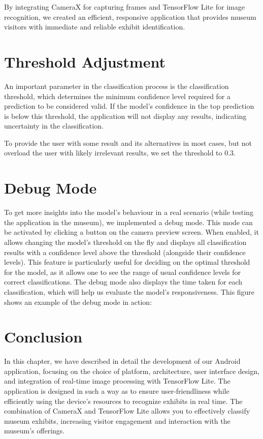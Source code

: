 By integrating CameraX for capturing frames and TensorFlow Lite for image recognition, we created an efficient, responsive application that provides museum visitors with immediate and reliable exhibit identification.

\section{Threshold Adjustment}

An important parameter in the classification process is the classification threshold, which determines the minimum confidence level required for a prediction to be considered valid. If the model's confidence in the top prediction is below this threshold, the application will not display any results, indicating uncertainty in the classification. 

To provide the user with some result and its alternatives in most cases, but not overload the user with likely irrelevant results, we set the threshold to 0.3.

\section{Debug Mode}

To get more insights into the model's behaviour in a real scenario (while testing the application in the museum), we implemented a debug mode. This mode can be activated by clicking a button on the camera preview screen. When enabled, it allows changing the model's threshold on the fly and displays all classification results with a confidence level above the threshold (alongside their confidence levels). This feature is particularly useful for deciding on the optimal threshold for the model, as it allows one to see the range of usual confidence levels for correct classifications. The debug mode also displays the time taken for each classification, which will help us evaluate the model's responsiveness. This figure shows an example of the debug mode in action:

\section{Conclusion}

In this chapter, we have described in detail the development of our Android application, focusing on the choice of platform, architecture, user interface design, and integration of real-time image processing with TensorFlow Lite. The application is designed in such a way as to ensure user-friendliness while efficiently using the device's resources to recognize exhibits in real time. The combination of CameraX and TensorFlow Lite allows you to effectively classify museum exhibits, increasing visitor engagement and interaction with the museum's offerings.